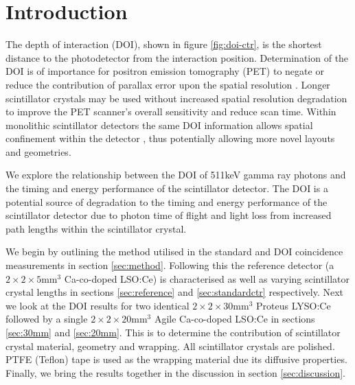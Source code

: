 \section{Introduction} 
The depth of interaction (DOI), shown in figure \ref{fig:doi-ctr}, is the shortest distance to the photodetector from the interaction position. Determination of the DOI is of importance for positron emission tomography (PET) to negate or reduce the contribution of parallax error upon the spatial resolution \cite{Moses_2001}\cite{Humm_Rosenfeld_Del_Guerra_2003}. Longer scintillator crystals may be used without increased spatial resolution degradation to improve the PET scanner's overall sensitivity and reduce scan time. Within monolithic scintillator detectors the same DOI information allows spatial confinement within the detector \cite{am_Borghi_Seifert_Schaart_2013}\cite{Maas_Bruyndonckx_Schaart_2012}, thus potentially allowing more novel\cite{Dendooven_Lohner_Beekman_2009}\cite{n_der_Lei_van_Dam_Schaart_2013} layouts and geometries.

We explore the relationship between the DOI of 511keV gamma ray photons and the timing and energy performance of the scintillator detector. The DOI is a potential source of degradation to the timing and energy performance of the scintillator detector due to photon time of flight and light loss from increased path lengths within the scintillator crystal.

We begin by outlining the method utilised in the standard and DOI coincidence measurements in section \ref{sec:method}. Following this the reference detector (a $2\times2\times5$mm$^3$ Ca-co-doped LSO:Ce) is characterised as well as varying scintillator crystal lengths in sections \ref{sec:reference} and \ref{sec:standardctr} respectively. Next we look at the DOI results for two identical $2\times2\times30$mm$^3$ Proteus LYSO:Ce followed by a single $2\times2\times20$mm$^3$ Agile Ca-co-doped LSO:Ce in sections \ref{sec:30mm} and \ref{sec:20mm}. This is to determine the contribution of scintillator crystal material, geometry and wrapping. All scintillator crystals are polished. PTFE (Teflon) tape is used as the wrapping material due its diffusive properties. Finally, we bring the results together in the discussion in section \ref{sec:discussion}.
